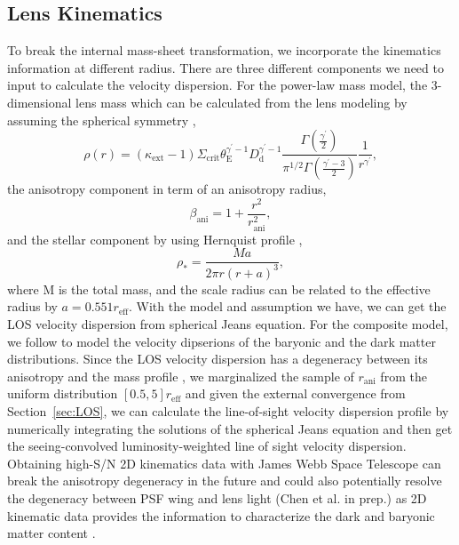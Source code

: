 \documentclass[useAMS,usenatbib]{mnras}
\newcommand{\sref}[1]{Section~\ref{#1}}
\begin{document}
\subsection{Lens Kinematics}
\label{sec:kinematics}
To break the internal mass-sheet transformation, we incorporate the kinematics information at different radius. There are three different components we need to input to calculate the velocity dispersion. For the power-law mass model, the 3-dimensional lens mass which can be calculated from the lens modeling by assuming the spherical symmetry \citep{SuyuEtal13},
\begin{equation}
\rho\left(r\right)=\left(\kappa_{\textrm{ext}}-1\right)\Sigma_{\textrm{crit}}\theta_{\textrm{E}}^{\gamma^{\prime}-1}D_{\textrm{d}}^{\gamma^{\prime}-1}\frac{\Gamma\left(\frac{\gamma^{\prime}}{2}\right)}{\pi^{1/2}\Gamma\left(\frac{\gamma^{\prime}-3}{2}\right)}\frac{1}{r^{\gamma^{\prime}}},
\end{equation}
the anisotropy component in term of an anisotropy radius, 
\begin{equation}
\beta_{\textrm{ani}}=1+\frac{r^{2}}{r^{2}_{\textrm{ani}}},
\end{equation}
and the stellar component by using Hernquist profile \citep{Hernquist90},
\begin{equation}
\rho_{\ast}=\frac{Ma}{2\pi r(r+a)^3},
\end{equation}
where M is the total mass, and the scale radius can be related to the effective radius by $a=0.551r_{\textrm{eff}}$. 
With the model and assumption we have, we can get the LOS velocity dispersion from spherical Jeans equation. 
For the composite model, we follow \citet{SonnenfeldEtal12} to model the velocity dipserions of the baryonic and the dark matter distributions.
Since the LOS velocity dispersion has a degeneracy between its anisotropy and the mass profile \citep{Dejonghe87}, we marginalized the sample of $r_{\textrm{ani}}$ from the uniform distribution $[0.5,5]r_{\textrm{eff}}$ and given the external convergence from \sref{sec:LOS}, we can calculate the line-of-sight velocity dispersion profile by numerically integrating the solutions of the spherical Jeans equation and then get the seeing-convolved luminosity-weighted line of sight velocity dispersion. 
Obtaining high-S/N 2D kinematics data with James Webb Space Telescope can break the anisotropy degeneracy in the future \citep[][Y{\i}ld{\i}r{\i}m in prep.]{ShajibEtal18} and could also potentially resolve the degeneracy between PSF wing and lens light (Chen et al. in prep.) as 2D kinematic data provides the information to characterize the dark and baryonic matter content \citep{CappellariEtal13}.
\end{document}
